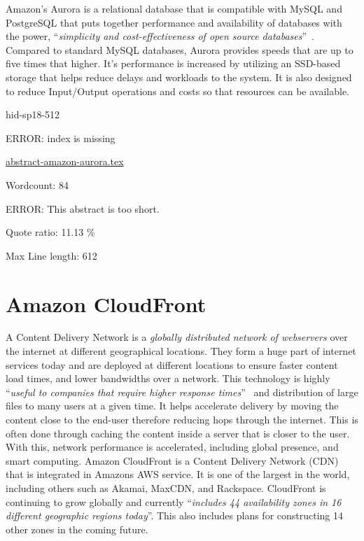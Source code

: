 Amazon's Aurora is a relational database that is compatible with MySQL and PostgreSQL that puts together performance and availability of databases with the power, \color{blue}``\emph{simplicity and cost-effectiveness of open source databases}''\color{black}~\cite{hid-sp18-512-amazon-aurora}. Compared to standard MySQL databases, Aurora provides speeds that are up to five times that higher. It's performance is increased by utilizing an SSD-based storage that helps reduce delays and workloads to the system. It is also designed to reduce Input/Output operations and costs so that resources can be available.  


\begin{IU}

hid-sp18-512

ERROR: index is missing

\href{https://github.com/cloudmesh-community/hid-sp18-512/blob/master//technology/abstract-amazon-aurora.tex}{abstract-amazon-aurora.tex}

 

Wordcount: 84

ERROR: This abstract is too short.


Quote ratio: 11.13 \%
 
Max Line length: 612
\end{IU}

\section{Amazon CloudFront}

A Content Delivery Network is a \emph{globally distributed network of
  webservers} \cite{hid-sp18-512-amazon-cloudfront-b} over the
internet at different geographical locations. They form a huge part of
internet services today and are deployed at different locations to
ensure faster content load times, and lower bandwidths over a
network. This technology is highly \color{blue}``\emph{useful to companies that require
higher response times}''\color{black}~\cite{hid-sp18-512-amazon-cloudfront-b} and
distribution of large files to many users at a given time. It helps
accelerate delivery by moving the content close to the end-user
therefore reducing hops through the internet. This is often done
through caching the content inside a server that is closer to the
user. With this, network performance is accelerated, including global
presence, and smart computing. Amazon CloudFront is a Content Delivery
Network (CDN) that is integrated in Amazons AWS service. It is one of
the largest in the world, including others such as Akamai, MaxCDN, and
Rackspace. CloudFront is continuing to grow globally and currently
\color{blue}``\emph{includes 44 availability zones in 16 different geographic regions
today}''\color{black}\cite{hid-sp18-512-amazon-cloudfront-a}. This also includes
plans for constructing 14 other zones in the coming future.


